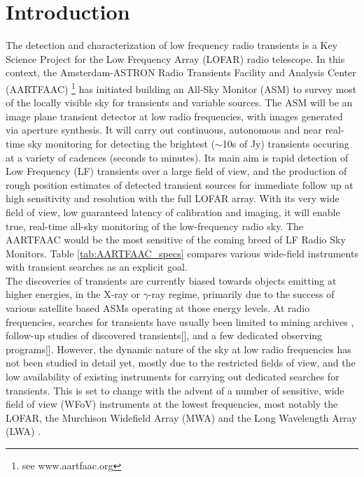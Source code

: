 \documentclass{aa}
\begin{document}
\maketitle

\section{\label{sec:Introduction}Introduction}
The detection  and characterization of low  frequency radio transients  is a Key
Science  Project \citep{fender2006lofar}  for  the Low  Frequency Array  (LOFAR)
\citep{vanhaarlem2013lofar}   radio    telescope.    In   this    context,   the
Amsterdam-ASTRON    Radio    Transients    Facility    and    Analysis    Center
(AARTFAAC) \footnote{see  www.aartfaac.org }  has initiated building  an All-Sky
Monitor  (ASM) to  survey most  of the  locally visible  sky for  transients and
variable sources.   The ASM  will be  an image plane  transient detector  at low
radio frequencies, with images generated  via aperture synthesis.  It will carry
out continuous, autonomous  and near real-time sky monitoring  for detecting the
brightest  ($\sim$10s  of Jy)  transients  occuring  at  a variety  of  cadences
(seconds to  minutes). Its  main aim  is rapid detection  of Low  Frequency (LF)
transients over  a large  field of  view, and the  production of  rough position
estimates  of  detected  transient  sources  for immediate  follow  up  at  high
sensitivity and resolution  with the full LOFAR array. With  its very wide field
of view, low guaranteed latency of calibration and imaging, it will enable true,
real-time all-sky monitoring of the  low-frequency radio sky. The AARTFAAC would
be  the most sensitive  of the  coming breed  of LF  Radio Sky  Monitors.  Table
\ref{tab:AARTFAAC_specs} compares various  wide-field instruments with transient
searches as an explicit goal.\\

The discoveries of  transients are currently biased towards  objects emitting at
higher  energies, in  the X-ray  or $\gamma$-ray  regime, primarily  due  to the
success of  various satellite  based ASMs operating  at those energy  levels. At
radio frequencies, searches  for transients have usually been  limited to mining
archives  \citep{bower2007submillijansky,bower2011search}, follow-up  studies of
discovered     transients{[}{]},    and     a     few    dedicated     observing
programs{[}{]}. However, the dynamic nature  of the sky at low radio frequencies
has not been studied in detail yet, mostly due to the restricted fields of view,
and  the low  availability of  existing instruments  for carrying  out dedicated
searches for transients.  This  is set to change with the advent  of a number of
sensitive, wide field of view (WFoV) instruments at the lowest frequencies, most
notably     the     LOFAR,     the     Murchison    Widefield     Array     (MWA)
\citep{lonsdale2009murchison}    and   the    Long   Wavelength    Array   (LWA)
\citep{ellingson2009long}.
\end{document}
